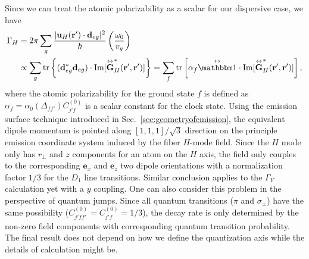 Since we can treat the atomic polarizability as a scalar for our dispersive case, we have 
\begin{align}
\Gamma_H &= 2\pi \sum_g \frac{|\mathbf{u}_H(\br')\cdot \mathbf{d}_{eg}|^2}{\hbar}\left(\frac{\omega_0}{v_g} \right) \\
&\propto \sum_g \tr \left\{(\mathbf{d}_{eg}^*\mathbf{d}_{eg})\cdot \mathrm{Im} [\GFT_H^*(\br',\br')] \right\}  = \sum_f \tr \left[ \alpha_f \eye\cdot \mathrm{Im} [\GFT_H^*(\br',\br')]  \right],
\end{align}
where the atomic polarizability for the ground state $ f $ is defined as $ \alpha_f=\alpha_0(\Delta_{ff'})C_{j'f}^{(0)} $ is a scalar constant for the clock state. Using the emission surface technique introduced in Sec.~\ref{sec:geometryofemission}, the equivalent dipole momentum is pointed along $ [1,1,1]/\sqrt{3} $ direction on the principle emission coordinate system induced by the fiber $ H $-mode field. Since the $ H $ mode only has $ r\!_\perp $ and $ z $ components for an atom on the $ H $ axis, the field only couples to the corresponding $ \mathbf{e}_x $ and $ \mathbf{e}_z $ two dipole orientations with a normalization factor $ 1/3 $ for the $ D_1 $ line transitions. Similar conclusion applies to the $ \Gamma_V $ calculation yet with a $ y $ coupling. One can also consider this problem in the perspective of quantum jumps. Since all quantum transitions ($ \pi$ and $\sigma_\pm $) have the same possibility ($C_{j'ff'}^{(0)}=C_{j'f}^{(0)}=1/3 $), the decay rate is only determined by the non-zero field components with corresponding quantum transition probability. The final result does not depend on how we define the quantization axis while the details of calculation might be. 



